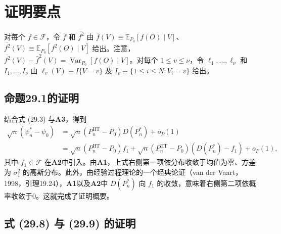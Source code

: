\FloatBarrier
\section{证明要点}

对每个 $f\in\mathcal F$，令 $\bar f$ 和 $\overline{f^2}$ 由 $\bar f(V)\equiv\mathbb E_{P_0}[f(O)\mid V]$、$\overline{f^2}(V)\equiv\mathbb E_{P_0}[f^2(O)\mid V]$ 给出。注意，$\overline{f^2}(V)-\bar f^2(V)=\operatorname{Var}_{P_0}[f(O)\mid V]$。对每个 $1\le v\le\nu$，令 $\ell_1,\ldots,\ell_\nu$ 和 $I_1,\ldots,I_\nu$ 由 $\ell_v(V)\equiv I\{V=v\}$ 及 $I_v\equiv\{1\le i\le N:V_i=v\}$ 给出。

\subsection{命题29.1的证明}

结合式 (29.3) 与\textbf{A3}，得到
\[
\begin{aligned}
\sqrt n(\psi_n^*-\psi_0)
&=\sqrt n(P_n^{\mathrm{HT}}-P_0)D(P_n^*)+o_P(1)\\
&=\sqrt n(P_n^{\mathrm{HT}}-P_0)f_1
+\sqrt n(P_n^{\mathrm{HT}}-P_0)(D(P_n^*)-f_1)+o_P(1),
\end{aligned}
\]
其中 $f_1\in\mathcal F$ 在\textbf{A2}中引入。由\textbf{A1}，上式右侧第一项依分布收敛于均值为零、方差为 $\sigma_1^2$ 的高斯分布。此外，由经验过程理论的一个经典论证（van der Vaart，1998，引理19.24），\textbf{A1}以及\textbf{A2}中 $D(P_n^*)$ 向 $f_1$ 的收敛，意味着右侧第二项依概率收敛于0。这就完成了证明概要。

\subsection{式 (29.8) 与 (29.9) 的证明}

